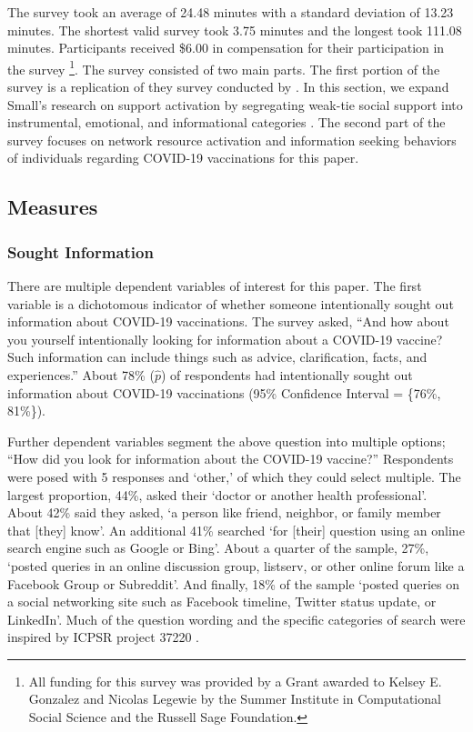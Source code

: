 The survey took an average of 24.48 minutes with a standard deviation of 13.23 minutes.
The shortest valid survey took 3.75 minutes and the longest took 111.08 minutes.
Participants received \$6.00 in compensation for their participation in the survey
\footnote{All funding for this survey was provided by a Grant awarded to Kelsey E. 
Gonzalez and Nicolas Legewie by the Summer Institute in Computational Social Science
and the Russell Sage Foundation.}. The survey consisted of two main parts. The
first portion of the survey is a replication of they survey conducted by 
\citet{smallSomeoneTalk2017}. In this section, we expand Small's research on 
support activation by segregating weak-tie social support into instrumental, 
emotional, and informational categories \citep[see][]{houseStructuresProcessesSocial1988}.
The second part of the survey focuses on network resource activation and 
information seeking behaviors of individuals regarding COVID-19 vaccinations
for this paper.



\hypertarget{measures}{%
\subsection{Measures}\label{measures}}

\hypertarget{sought-information}{%
\subsubsection{Sought Information}\label{sought-information}}

There are multiple dependent variables of interest for this paper. The first
variable is a dichotomous indicator of whether someone intentionally sought out
information about COVID-19 vaccinations. The survey asked, ``And how about you
yourself intentionally looking for information about a COVID-19 vaccine? Such
information can include things such as advice, clarification, facts, and
experiences.'' About 78\% (\(\widehat{p}\))
of respondents had intentionally sought out information about COVID-19
vaccinations (95\% Confidence Interval = \{76\%, 81\%\}).

Further dependent variables segment the above question into multiple options;
``How did you look for information about the COVID-19 vaccine?'' Respondents were
posed with 5 responses and `other,' of which they could select multiple. The
largest proportion, 44\%, asked their `doctor or another health professional'.
About 42\% said they asked, `a person like friend, neighbor, or family member 
that [they] know'. An additional 41\% searched `for [their] question
using an online search engine such as Google or Bing'. About a quarter of the
sample, 27\%, `posted queries in an online discussion group, listserv, or 
other online forum like a Facebook Group or Subreddit'. And finally, 18\% of 
the sample `posted queries on a social networking site such as Facebook timeline, 
Twitter status update, or LinkedIn'.
Much of the question wording and the specific categories of search were inspired
by ICPSR project 37220 \citep{scanlon19}.


